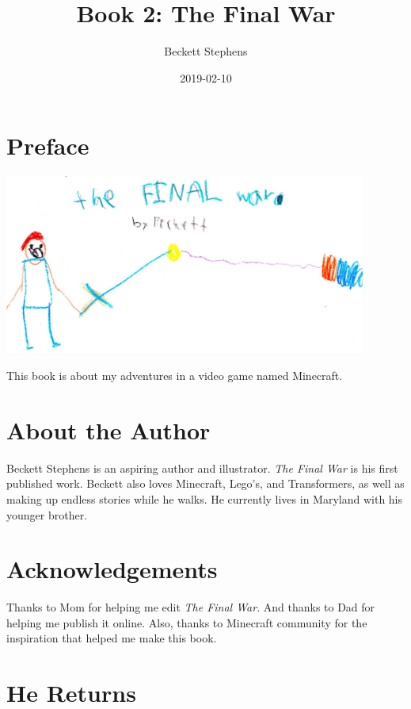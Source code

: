 \documentclass[12pt,oneside]{krantz}
\title{Book 2: The Final War}
\author{Beckett Stephens}
\date{2019-02-10}
\begin{document}
\maketitle

{
\setcounter{tocdepth}{1}
\tableofcontents
}
\hypertarget{preface}{%
\chapter*{Preface}\label{preface}}


\includegraphics[width=4.6875in,height=\textheight]{img/final-war.jpg}

This book is about my adventures in a video game named Minecraft.

\hypertarget{about-the-author}{%
\chapter*{About the Author}\label{about-the-author}}


Beckett Stephens is an aspiring author and illustrator. \emph{The Final
War} is his first published work. Beckett also loves Minecraft, Lego's,
and Transformers, as well as making up endless stories while he walks.
He currently lives in Maryland with his younger brother.

\hypertarget{acknowledgements}{%
\chapter*{Acknowledgements}\label{acknowledgements}}


Thanks to Mom for helping me edit \emph{The Final War}. And thanks to
Dad for helping me publish it online. Also, thanks to Minecraft
community for the inspiration that helped me make this book.

\hypertarget{he-returns}{%
\chapter{He Returns}\label{he-returns}}
\end{document}
